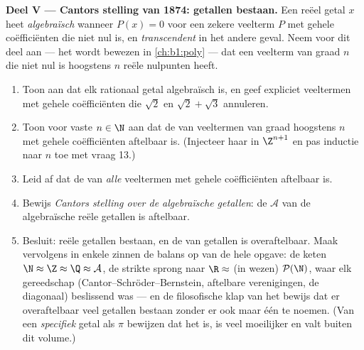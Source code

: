 \begin{problem}
\medskip
\noindent\textbf{Deel V --- Cantors stelling van 1874: 
getallen bestaan.} Een reëel getal $x$ heet \emph{algebraïsch}
 wanneer $P(x) = 0$ voor een zekere veelterm $P$
met gehele coëfficiënten die niet nul is, en \emph{transcendent}
 in het andere geval. Neem voor dit deel aan
--- het wordt bewezen in \cref{ch:b1:poly} --- dat een veelterm van
graad $n$ die niet nul is hoogstens $n$ reële nulpunten heeft.
\begin{enumerate}[resume]
  \item Toon aan dat elk rationaal getal algebraïsch is, en geef expliciet
        veeltermen met gehele coëfficiënten die $\sqrt 2$ en $\sqrt 2 +
        \sqrt 3$ annuleren.
  \item Toon voor vaste $n \in \N$ aan dat de  van veeltermen
        van graad hoogstens $n$ met gehele coëfficiënten aftelbaar is.
        (Injecteer haar in $\Z^{n+1}$ en pas inductie naar $n$ toe met
        vraag 13.)
  \item Leid af dat de  van \emph{alle} veeltermen met gehele
        coëfficiënten aftelbaar is.
  \item Bewijs \emph{Cantors stelling over de algebraïsche getallen}: de
         $\mathcal{A}$ van de algebraïsche reële getallen is
        aftelbaar.
  \item Besluit:  reële getallen bestaan, en de 
        van  getallen is overaftelbaar. Maak vervolgens in
        enkele zinnen de balans op van de hele opgave: de keten $\N
        \approx \Z \approx \Q \approx \mathcal{A}$, de strikte sprong
        naar $\R \approx$ (in wezen) $\mathcal{P}(\N)$, waar elk
        gereedschap (Cantor--Schröder--Bernstein, aftelbare
        verenigingen, de diagonaal) beslissend was --- en de filosofische
        klap van het bewijs dat er overaftelbaar veel 
        getallen bestaan zonder er ook maar één te noemen. (Van een
        \emph{specifiek} getal als $\pi$ bewijzen dat het 
        is, is veel moeilijker en valt buiten dit volume.)
\end{enumerate}
\end{problem}
